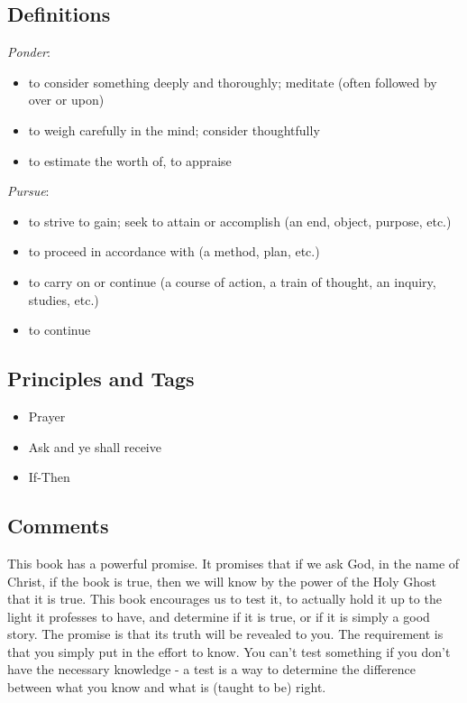 \documentclass[12pt]{report}
\begin{document}
\subsection{Definitions\label{intro:DFN8}}
\emph{Ponder}: \begin{itemize}
\item to consider something deeply and thoroughly; meditate (often followed by over or upon)
\item to weigh carefully in the mind; consider thoughtfully
\item to estimate the worth of, to appraise
\end{itemize}
\emph{Pursue}: \begin{itemize}
\item to strive to gain; seek to attain or accomplish (an end, object, purpose, etc.)
\item to proceed in accordance with (a method, plan, etc.)
\item to carry on or continue (a course of action, a train of thought, an inquiry, studies, etc.)
\item to continue
\end{itemize}
\subsection{Principles and Tags\label{intro:principles8}}
\begin{itemize}
\item {}Prayer
\item {}Ask and ye shall receive
\item {}If-Then
\end{itemize}

\subsection{Comments\label{intro:comments8}}
This book has a powerful promise.  It promises that if we ask God, in the name of Christ, if the book is true, then we will know by the power of the Holy Ghost that it is true.  This book encourages us to test it, to actually hold it up to the light it professes to have, and determine if it is true, or if it is simply a good story.  The promise is that its truth will be revealed to you. The requirement is that you simply put in the effort to know.  You can't test something if you don't have the necessary knowledge - a test is a way to determine the difference between what you know and what is (taught to be) right.
\end{document}
